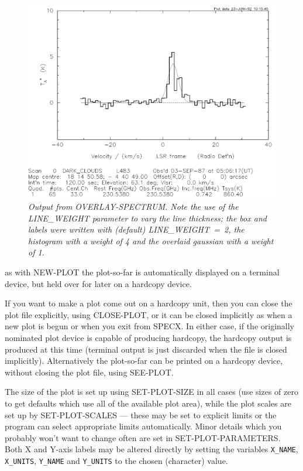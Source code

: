 \documentclass[11pt,twoside]{report}
\begin{document}
\begin{figure}[htbp]
\begin{center}
\includegraphics[scale=0.65]{overlay}
\protect\parbox{5.5in}
{\caption[PLOT]
{\sl
Output from OVERLAY-SPECTRUM. Note the use of the LINE\_WEIGHT
parameter to vary the line thickness; the box and labels were written
with (default) LINE\_WEIGHT~=~2, the histogram with a weight of 4
and the overlaid gaussian with a weight of 1.
\label{PLOT}
}
}
\end{center}
\end{figure}
as with NEW-PLOT the plot-so-far is automatically displayed on a
terminal device, but held over for later on a hardcopy device.

If you want to make a plot come out on a hardcopy unit, then
you can close the plot file explicitly, using CLOSE-PLOT, or it can be closed
implicitly as when a new plot is begun or when you exit from SPECX. In either
case, if the originally nominated plot device is capable of producing hardcopy,
the hardcopy output is produced at this time (terminal output is just discarded
when the file is closed implicitly). Alternatively the plot-so-far can be
printed on a hardcopy device, without closing the plot file, using SEE-PLOT.

The size of the plot
is set up using SET-PLOT-SIZE in all cases (use sizes of zero to get
defaults which use all of the available plot area), while the plot scales
are set up by SET-PLOT-SCALES --- these may be set to explicit limits or the
program can select appropriate limits automatically. Minor details which you
probably won't want to change often are set in SET-PLOT-PARAMETERS.
Both X and Y-axis labels may be altered directly by setting the variables
\verb+X_NAME+, \verb+X_UNITS+, \verb+Y_NAME+ and \verb+Y_UNITS+ to the chosen
(character) value.
\end{document}
